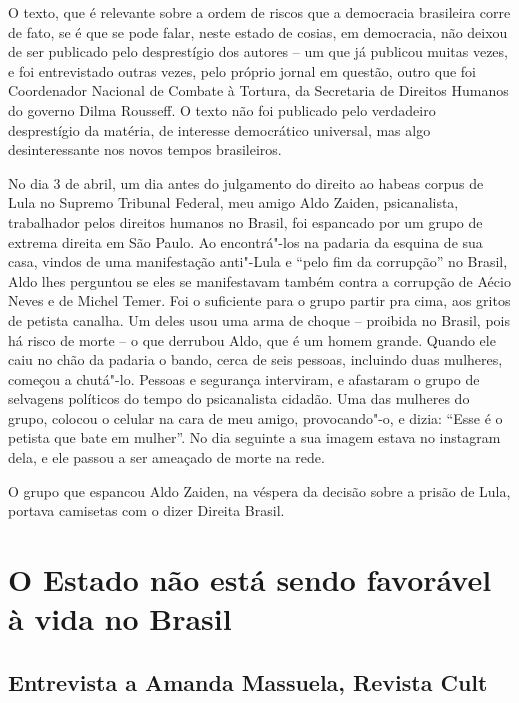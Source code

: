 O texto, que é relevante sobre a ordem de riscos que a democracia
brasileira corre de fato, se é que se pode falar, neste estado de
cosias, em democracia, não deixou de ser publicado pelo desprestígio dos
autores -- um que já publicou muitas vezes, e foi entrevistado outras
vezes, pelo próprio jornal em questão, outro que foi Coordenador
Nacional de Combate à Tortura, da Secretaria de Direitos Humanos do
governo Dilma Rousseff. O texto não foi publicado pelo verdadeiro
desprestígio da matéria, de interesse democrático universal, mas algo
desinteressante nos novos tempos brasileiros.

\begin{center}
\end{center}

No dia 3 de abril, um dia antes do julgamento do direito ao habeas
corpus de Lula no Supremo Tribunal Federal, meu amigo Aldo Zaiden,
psicanalista, trabalhador pelos direitos humanos no Brasil, foi
espancado por um grupo de extrema direita em São Paulo. Ao encontrá"-los
na padaria da esquina de sua casa, vindos de uma manifestação anti"-Lula
e ``pelo fim da corrupção'' no Brasil, Aldo lhes perguntou se eles se
manifestavam também contra a corrupção de Aécio Neves e de Michel Temer.
Foi o suficiente para o grupo partir pra cima, aos gritos de petista
canalha. Um deles usou uma arma de choque -- proibida no Brasil, pois há
risco de morte -- o que derrubou Aldo, que é um homem grande. Quando ele
caiu no chão da padaria o bando, cerca de seis pessoas, incluindo duas
mulheres, começou a chutá"-lo. Pessoas e segurança interviram, e
afastaram o grupo de selvagens políticos do tempo do psicanalista
cidadão. Uma das mulheres do grupo, colocou o celular na cara de meu
amigo, provocando"-o, e dizia: ``Esse é o petista que bate em mulher''.
No dia seguinte a sua imagem estava no instagram dela, e ele passou a
ser ameaçado de morte na rede.

O grupo que espancou Aldo Zaiden, na véspera da decisão sobre a prisão
de Lula, portava camisetas com o dizer Direita Brasil.

\chapter{O Estado não está sendo favorável à vida no Brasil}


\section{Entrevista a Amanda Massuela, Revista Cult}

